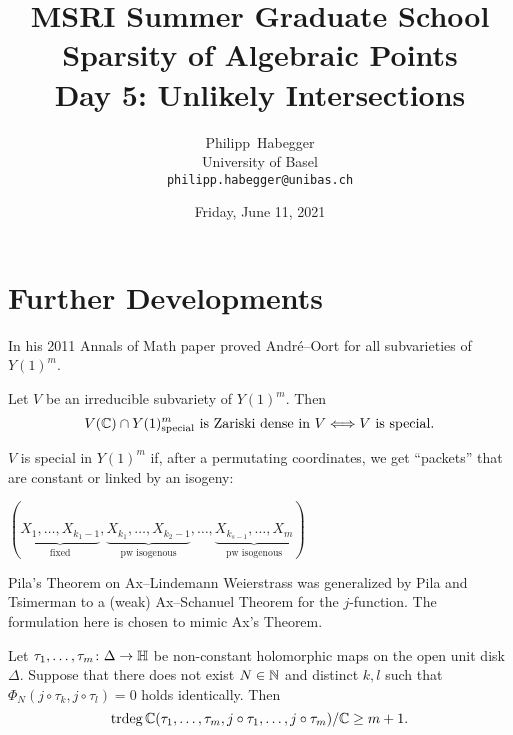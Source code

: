 \documentclass{beamer}
\title{MSRI Summer Graduate School \\ Sparsity of Algebraic Points \\
  Day 5: Unlikely Intersections}
\author{Philipp~Habegger \\ University of Basel \\ \texttt{philipp.habegger@unibas.ch}}
\date{Friday, June 11, 2021}
\begin{document}
\setlength{\abovecaptionskip}{0pt} 
\setlength{\belowcaptionskip}{0pt} 

\renewcommand{\figurename}{Fig.}


\begin{frame}
  \titlepage
\end{frame}

\section{Further Developments}

\begin{frame}
  In his 2011 Annals of Math paper proved Andr\'e--Oort for
  all subvarieties of $Y(1)^m$.

  \begin{theorem}[Pila]
    Let $V$ be an irreducible subvariety of $Y(1)^m$. Then
    $$V({\mathbb{C}})\cap
    Y(1)^{m}_{\mathrm{special}}\text{ is Zariski dense in
      $V$}\Longleftrightarrow V\text{ is special.}$$
  \end{theorem}

  $V$ is  special in $Y(1)^m$ if, after a  permutating coordinates, we get
  ``packets'' that are constant or linked by an isogeny:
  \vspace{-.2cm}
  \begin{center}
  $(\underbrace{X_1,\ldots,X_{k_1-1}}_{\text{fixed}},\underbrace{X_{k_1},\ldots,X_{k_2-1}}_{\text{pw
      isogenous}},\ldots,
  \underbrace{X_{k_{s-1}},\ldots,X_m}_{\text{pw isogenous}})$      
  \end{center}  
\end{frame}


\begin{frame}
  Pila's Theorem on Ax--Lindemann Weierstrass
  was generalized by Pila and Tsimerman to a (weak) Ax--Schanuel
  Theorem for the $j$-function. The formulation here is chosen to
  mimic Ax's Theorem.

  \begin{theorem}
    Let $\tau_1,\ldots,\tau_m\colon\Delta\rightarrow{\mathbb{H}}$ be
    non-constant holomorphic maps on the open unit disk $\Delta$.
    Suppose that there does not exist $N\in{\mathbb{N}}$ and distinct $k,l$
    such that $\Phi_N(j\circ\tau_k,j\circ \tau_l)=0$ holds
    identically. Then
    \begin{equation*}
      \mathrm{trdeg}\,{\mathbb{C}}(\tau_1,\ldots,\tau_m,j\circ\tau_1,\ldots,j\circ\tau_m)/{\mathbb{C}}
      \ge m+1.
    \end{equation*}
  \end{theorem}   
\end{frame}
\end{document}

